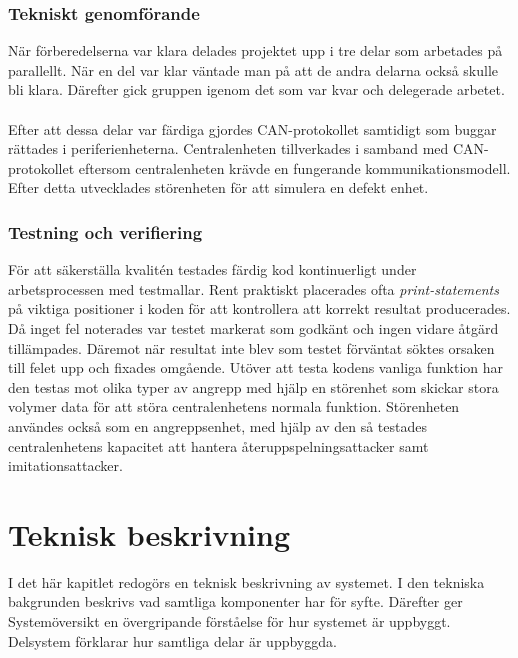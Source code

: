 \documentclass{article}
\begin{document}
\subsubsection{Tekniskt genomförande}
När förberedelserna var klara delades projektet upp i tre delar som arbetades på parallellt. När en del var klar väntade man på att de andra delarna också skulle bli klara. 
Därefter gick gruppen igenom det som var kvar och delegerade arbetet.
\\
\\
Efter att dessa delar var färdiga gjordes CAN-protokollet samtidigt som buggar rättades i periferienheterna. Centralenheten tillverkades i samband med CAN-protokollet eftersom centralenheten krävde en fungerande kommunikationsmodell. Efter detta utvecklades störenheten för att simulera en defekt enhet.

\subsubsection{Testning och verifiering}
För att säkerställa kvalitén testades färdig kod kontinuerligt under arbetsprocessen med testmallar.
Rent praktiskt placerades ofta \emph{print-statements} på viktiga positioner i koden för att kontrollera att korrekt resultat producerades.
Då inget fel noterades var testet markerat som godkänt och ingen vidare åtgärd tillämpades. 
Däremot när resultat inte blev som testet förväntat söktes orsaken till felet upp och fixades omgående.
Utöver att testa kodens vanliga funktion har den testas mot olika typer av angrepp med hjälp en störenhet som skickar stora volymer data för att störa centralenhetens normala funktion. 
Störenheten användes också som en angreppsenhet, med hjälp av den så testades centralenhetens kapacitet att hantera återuppspelningsattacker samt imitationsattacker.

\section{Teknisk beskrivning}
I det här kapitlet redogörs en teknisk beskrivning av systemet. 
I den tekniska bakgrunden beskrivs vad samtliga komponenter har för syfte. Därefter ger Systemöversikt en övergripande förståelse för hur systemet är uppbyggt. 
Delsystem förklarar hur samtliga delar är uppbyggda.
\end{document}
